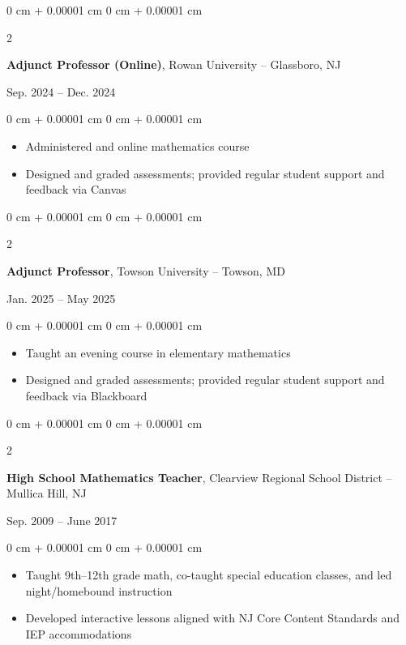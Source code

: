 \documentclass[10pt, letterpaper]{article}
\newenvironment{highlights}{
    \begin{itemize}[
        topsep=0.10 cm,
        parsep=0.10 cm,
        partopsep=0pt,
        itemsep=0pt,
        leftmargin=0 cm + 10pt
    ]
}{
    \end{itemize}
} %
\newenvironment{onecolentry}{
    \begin{adjustwidth}{
        0 cm + 0.00001 cm
    }{
        0 cm + 0.00001 cm
    }
}{
    \end{adjustwidth}
} %
\newenvironment{twocolentry}[2][]{
    \onecolentry
    \def\secondColumn{#2}
    \setcolumnwidth{\fill, 4.5 cm}
    \begin{paracol}{2}
}{
    \switchcolumn \raggedleft \secondColumn
    \end{paracol}
    \endonecolentry
} %
\begin{document}
\vspace{0.2 cm}

\begin{twocolentry}{
    Sep. 2024 – Dec. 2024
}
    \textbf{Adjunct Professor (Online)}, Rowan University -- Glassboro, NJ
\end{twocolentry}

\vspace{0.10 cm}
\begin{onecolentry}
    \begin{highlights}
        \item Administered and online mathematics course
        \item Designed and graded assessments; provided regular student support and feedback via Canvas
    \end{highlights}
\end{onecolentry}

\vspace{0.2 cm}

\begin{twocolentry}{
    Jan. 2025 – May 2025
}
    \textbf{Adjunct Professor}, Towson University -- Towson, MD
\end{twocolentry}

\vspace{0.10 cm}
\begin{onecolentry}
    \begin{highlights}
        \item Taught an evening course in elementary mathematics
        \item Designed and graded assessments; provided regular student support and feedback via Blackboard
    \end{highlights}
\end{onecolentry}

\vspace{0.2 cm}

\begin{twocolentry}{
    Sep. 2009 – June 2017
}
    \textbf{High School Mathematics Teacher}, Clearview Regional School District -- Mullica Hill, NJ
\end{twocolentry}

\vspace{0.10 cm}
\begin{onecolentry}
    \begin{highlights}
        \item Taught 9th–12th grade math, co-taught special education classes, and led night/homebound instruction
        \item Developed interactive lessons aligned with NJ Core Content Standards and IEP accommodations
    \end{highlights}
\end{onecolentry}
\end{document}

